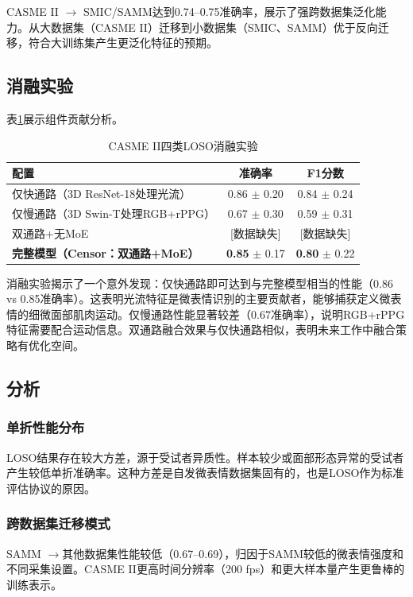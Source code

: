 CASME II $\rightarrow$ SMIC/SAMM达到0.74--0.75准确率，展示了强跨数据集泛化能力。从大数据集（CASME II）迁移到小数据集（SMIC、SAMM）优于反向迁移，符合大训练集产生更泛化特征的预期。

\subsection{消融实验}

表\ref{tab:ablation_cn}展示组件贡献分析。

\begin{table}[htbp]
\centering
\caption{CASME II四类LOSO消融实验}
\label{tab:ablation_cn}
\begin{tabular}{lcc}
\toprule
配置 & 准确率 & F1分数 \\
\midrule
仅快通路（3D ResNet-18处理光流） & 0.86 $\pm$ 0.20 & 0.84 $\pm$ 0.24 \\
仅慢通路（3D Swin-T处理RGB+rPPG） & 0.67 $\pm$ 0.30 & 0.59 $\pm$ 0.31 \\
双通路+无MoE & [数据缺失] & [数据缺失] \\
\textbf{完整模型（Censor：双通路+MoE）} & \textbf{0.85} $\pm$ 0.17 & \textbf{0.80} $\pm$ 0.22 \\
\bottomrule
\end{tabular}
\end{table}

消融实验揭示了一个意外发现：仅快通路即可达到与完整模型相当的性能（0.86 vs 0.85准确率）。这表明光流特征是微表情识别的主要贡献者，能够捕获定义微表情的细微面部肌肉运动。仅慢通路性能显著较差（0.67准确率），说明RGB+rPPG特征需要配合运动信息。双通路融合效果与仅快通路相似，表明未来工作中融合策略有优化空间。

\subsection{分析}

\subsubsection{单折性能分布}

LOSO结果存在较大方差，源于受试者异质性。样本较少或面部形态异常的受试者产生较低单折准确率。这种方差是自发微表情数据集固有的，也是LOSO作为标准评估协议的原因。

\subsubsection{跨数据集迁移模式}

SAMM $\rightarrow$其他数据集性能较低（0.67--0.69），归因于SAMM较低的微表情强度和不同采集设置。CASME II更高时间分辨率（200 fps）和更大样本量产生更鲁棒的训练表示。